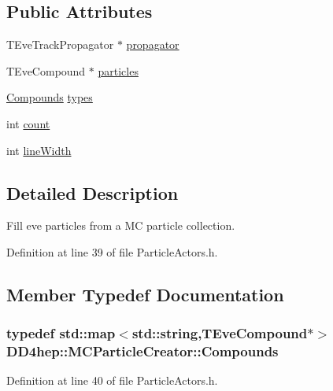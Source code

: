 \subsection*{Public Attributes}
\begin{DoxyCompactItemize}
\item 
TEveTrackPropagator $\ast$ \hyperlink{struct_d_d4hep_1_1_m_c_particle_creator_a536aef5f2059670db5b8dc81de6559a4}{propagator}
\item 
TEveCompound $\ast$ \hyperlink{struct_d_d4hep_1_1_m_c_particle_creator_aee3566635d042c98a8f849ff6213873c}{particles}
\item 
\hyperlink{struct_d_d4hep_1_1_m_c_particle_creator_a803ff0bb27e3c5cd40daf4d253eb2b62}{Compounds} \hyperlink{struct_d_d4hep_1_1_m_c_particle_creator_a622e212ec5e4471e2ae306e44839a69c}{types}
\item 
int \hyperlink{struct_d_d4hep_1_1_m_c_particle_creator_a91d20c4304e3781732682f75271f45ef}{count}
\item 
int \hyperlink{struct_d_d4hep_1_1_m_c_particle_creator_a105c9287f1f91d862a3d77d97be0557d}{lineWidth}
\end{DoxyCompactItemize}


\subsection{Detailed Description}
Fill eve particles from a MC particle collection. 

Definition at line 39 of file ParticleActors.h.

\subsection{Member Typedef Documentation}
\hypertarget{struct_d_d4hep_1_1_m_c_particle_creator_a803ff0bb27e3c5cd40daf4d253eb2b62}{
\subsubsection[{Compounds}]{\setlength{\rightskip}{0pt plus 5cm}typedef std::map$<$std::string,TEveCompound$\ast$$>$ {\bf DD4hep::MCParticleCreator::Compounds}}}
\label{struct_d_d4hep_1_1_m_c_particle_creator_a803ff0bb27e3c5cd40daf4d253eb2b62}


Definition at line 40 of file ParticleActors.h.

